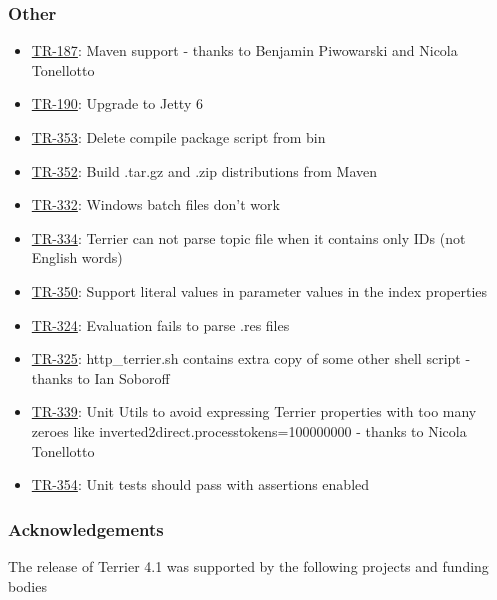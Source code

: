 \subsubsection{Other}\label{other}

\begin{itemize}
\tightlist
\item
  \href{http://terrier.org/issues/browse/TR-187}{TR-187}: Maven support
  - thanks to Benjamin Piwowarski and Nicola Tonellotto
\item
  \href{http://terrier.org/issues/browse/TR-190}{TR-190}: Upgrade to
  Jetty 6
\item
  \href{http://terrier.org/issues/browse/TR-353}{TR-353}: Delete compile
  package script from bin
\item
  \href{http://terrier.org/issues/browse/TR-352}{TR-352}: Build .tar.gz
  and .zip distributions from Maven
\item
  \href{http://terrier.org/issues/browse/TR-332}{TR-332}: Windows batch
  files don't work
\item
  \href{http://terrier.org/issues/browse/TR-334}{TR-334}: Terrier can
  not parse topic file when it contains only IDs (not English words)
\item
  \href{http://terrier.org/issues/browse/TR-350}{TR-350}: Support
  literal values in parameter values in the index properties
\item
  \href{http://terrier.org/issues/browse/TR-324}{TR-324}: Evaluation
  fails to parse .res files
\item
  \href{http://terrier.org/issues/browse/TR-325}{TR-325}:
  http\_terrier.sh contains extra copy of some other shell script -
  thanks to Ian Soboroff
\item
  \href{http://terrier.org/issues/browse/TR-339}{TR-339}: Unit Utils to
  avoid expressing Terrier properties with too many zeroes like
  inverted2direct.processtokens=100000000 - thanks to Nicola Tonellotto
\item
  \href{http://terrier.org/issues/browse/TR-354}{TR-354}: Unit tests
  should pass with assertions enabled
\end{itemize}

\subsubsection{Acknowledgements}\label{acknowledgements}

The release of Terrier 4.1 was supported by the following projects and
funding bodies


